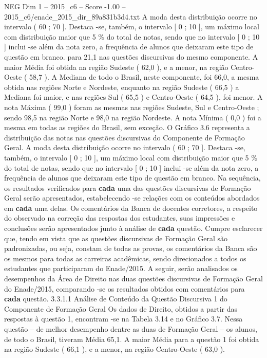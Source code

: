 \begin{textsample}{NEG Dim 1 – 2015\_c6 – Score -1.00 – 2015\_c6/enade\_2015\_dir\_89a831b3d4.txt}
A moda desta distribuição ocorre no intervalo ( 60 ; 70 ].
Destaca -se, também, o intervalo [ 0 ; 10 ], um máximo local com distribuição maior que 5 \% do total de notas, sendo que no intervalo [ 0 ; 10 ] inclui -se além da nota zero, a frequência de alunos que deixaram este tipo de questão em branco. para 21,1 nas questões discursivas do mesmo componente.
A maior Média foi obtida na região Sudeste ( 62,0 ), e a menor, na região Centro-Oeste ( 58,7 ).
A Mediana de todo o Brasil, neste componente, foi 66,0, a mesma obtida nas regiões Norte e Nordeste, enquanto na região Sudeste ( 66,5 ) a Mediana foi maior, e nas regiões Sul ( 65,5 ) e Centro-Oeste ( 64,5 ), foi menor.
A nota Máxima ( 99,0 ) foram as mesmas nas regiões Sudeste, Sul e Centro-Oeste ; sendo 98,5 na região Norte e 98,0 na região Nordeste.
A nota Mínima ( 0,0 ) foi a mesma em todas as regiões do Brasil, sem exceção.
O Gráfico 3.6 representa a distribuição das notas nas questões discursivas do Componente de Formação Geral.
A moda desta distribuição ocorre no intervalo ( 60 ; 70 ].
Destaca -se, também, o intervalo [ 0 ; 10 ], um máximo local com distribuição maior que 5 \% do total de notas, sendo que no intervalo [ 0 ; 10 ] inclui -se além da nota zero, a frequência de alunos que deixaram este tipo de questão em branco.
Na sequência, os resultados verificados para \textbf{cada} uma das questões discursivas de Formação Geral serão apresentados, estabelecendo -se relações com os conteúdos abordados em \textbf{cada} uma delas.
Os comentários da Banca de docentes corretores, a respeito do observado na correção das respostas dos estudantes, suas impressões e conclusões serão apresentados junto à análise de \textbf{cada} questão.
Cumpre esclarecer que, tendo em vista que as questões discursivas de Formação Geral são padronizadas, ou seja, constam de todas as provas, os comentários da Banca são os mesmos para todas as carreiras acadêmicas, sendo direcionados a todos os estudantes que participaram do Enade/2015.
A seguir, serão analisados os desempenhos da Área de Direito nas duas questões discursivas de Formação Geral do Enade/2015, comparando -se os resultados obtidos com comentários para \textbf{cada} questão. 3.3.1.1 Análise de Conteúdo da Questão Discursiva 1 do Componente de Formação Geral Os dados de Direito, obtidos a partir das respostas à questão 1, encontram -se na Tabela 3.14 e no Gráfico 3.7.
Nessa questão – de melhor desempenho dentre as duas de Formação Geral – os alunos, de todo o Brasil, tiveram Média 65,1.
A maior Média para a questão 1 foi obtida na região Sudeste ( 66,1 ), e a menor, na região Centro-Oeste ( 63,0 ).

\end{textsample}
